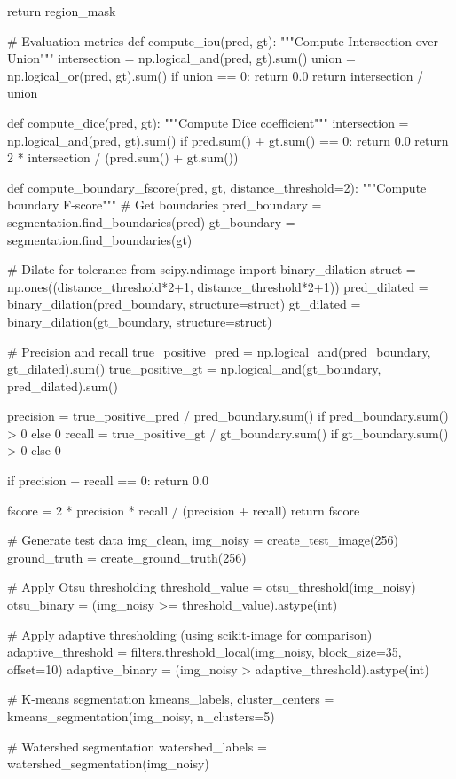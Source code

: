 \documentclass[a4paper, 11pt]{article}
\begin{document}
\begin{pycode}
    return region_mask

# Evaluation metrics
def compute_iou(pred, gt):
    """Compute Intersection over Union"""
    intersection = np.logical_and(pred, gt).sum()
    union = np.logical_or(pred, gt).sum()
    if union == 0:
        return 0.0
    return intersection / union

def compute_dice(pred, gt):
    """Compute Dice coefficient"""
    intersection = np.logical_and(pred, gt).sum()
    if pred.sum() + gt.sum() == 0:
        return 0.0
    return 2 * intersection / (pred.sum() + gt.sum())

def compute_boundary_fscore(pred, gt, distance_threshold=2):
    """Compute boundary F-score"""
    # Get boundaries
    pred_boundary = segmentation.find_boundaries(pred)
    gt_boundary = segmentation.find_boundaries(gt)

    # Dilate for tolerance
    from scipy.ndimage import binary_dilation
    struct = np.ones((distance_threshold*2+1, distance_threshold*2+1))
    pred_dilated = binary_dilation(pred_boundary, structure=struct)
    gt_dilated = binary_dilation(gt_boundary, structure=struct)

    # Precision and recall
    true_positive_pred = np.logical_and(pred_boundary, gt_dilated).sum()
    true_positive_gt = np.logical_and(gt_boundary, pred_dilated).sum()

    precision = true_positive_pred / pred_boundary.sum() if pred_boundary.sum() > 0 else 0
    recall = true_positive_gt / gt_boundary.sum() if gt_boundary.sum() > 0 else 0

    if precision + recall == 0:
        return 0.0

    fscore = 2 * precision * recall / (precision + recall)
    return fscore

# Generate test data
img_clean, img_noisy = create_test_image(256)
ground_truth = create_ground_truth(256)

# Apply Otsu thresholding
threshold_value = otsu_threshold(img_noisy)
otsu_binary = (img_noisy >= threshold_value).astype(int)

# Apply adaptive thresholding (using scikit-image for comparison)
adaptive_threshold = filters.threshold_local(img_noisy, block_size=35, offset=10)
adaptive_binary = (img_noisy > adaptive_threshold).astype(int)

# K-means segmentation
kmeans_labels, cluster_centers = kmeans_segmentation(img_noisy, n_clusters=5)

# Watershed segmentation
watershed_labels = watershed_segmentation(img_noisy)


\end{pycode}
\end{document}
